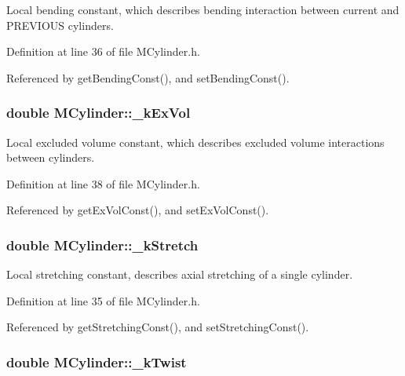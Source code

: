 Local bending constant, which describes bending interaction between current and P\+R\+E\+V\+I\+O\+U\+S cylinders. 



Definition at line 36 of file M\+Cylinder.\+h.



Referenced by get\+Bending\+Const(), and set\+Bending\+Const().

\hypertarget{classMCylinder_a7393cc9a56c96bf924be20248aca0b4a}{
\subsubsection[{\+\_\+k\+Ex\+Vol}]{\setlength{\rightskip}{0pt plus 5cm}double M\+Cylinder\+::\+\_\+k\+Ex\+Vol\hspace{0.3cm}{\ttfamily [private]}}}\label{classMCylinder_a7393cc9a56c96bf924be20248aca0b4a}


Local excluded volume constant, which describes excluded volume interactions between cylinders. 



Definition at line 38 of file M\+Cylinder.\+h.



Referenced by get\+Ex\+Vol\+Const(), and set\+Ex\+Vol\+Const().

\hypertarget{classMCylinder_af153db32e79db040668aeea45fcfe594}{
\subsubsection[{\+\_\+k\+Stretch}]{\setlength{\rightskip}{0pt plus 5cm}double M\+Cylinder\+::\+\_\+k\+Stretch\hspace{0.3cm}{\ttfamily [private]}}}\label{classMCylinder_af153db32e79db040668aeea45fcfe594}


Local stretching constant, describes axial stretching of a single cylinder. 



Definition at line 35 of file M\+Cylinder.\+h.



Referenced by get\+Stretching\+Const(), and set\+Stretching\+Const().

\hypertarget{classMCylinder_a411d5b040058afae90b54438f930cfc9}{
\subsubsection[{\+\_\+k\+Twist}]{\setlength{\rightskip}{0pt plus 5cm}double M\+Cylinder\+::\+\_\+k\+Twist\hspace{0.3cm}{\ttfamily [private]}}}\label{classMCylinder_a411d5b040058afae90b54438f930cfc9}


